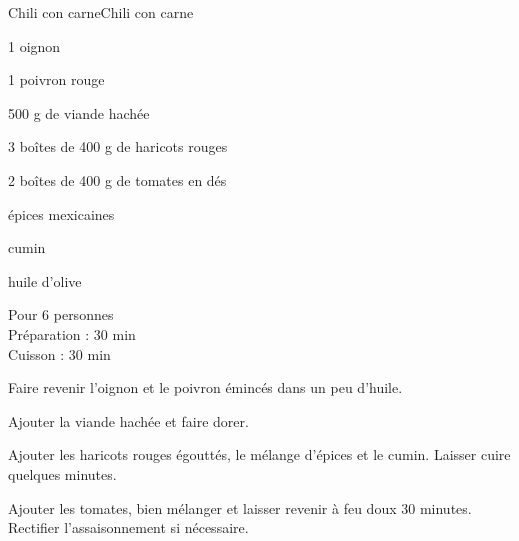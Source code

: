 \begin{recette}{Chili con carne}{Chili con carne}

\begin{ingredients}
1 oignon\par
1 poivron rouge\par
500 g de viande hachée\par
3 boîtes de 400 g de haricots rouges\par
2 boîtes de 400 g de tomates en dés\par
épices mexicaines\par
cumin\par
huile d'olive\par
\end{ingredients}

\begin{infos}
Pour 6 personnes\\
Préparation : 30 min\\
Cuisson : 30 min\\
\end{infos}

\begin{etapes}
\item Faire revenir l'oignon et le poivron émincés dans un peu d'huile.
\item Ajouter la viande hachée et faire dorer.
\item Ajouter les haricots rouges égouttés, le mélange d'épices et le cumin. Laisser cuire quelques minutes.
\item Ajouter les tomates, bien mélanger et laisser revenir à feu doux 30 minutes. Rectifier l'assaisonnement si nécessaire.
\end{etapes}

\end{recette}